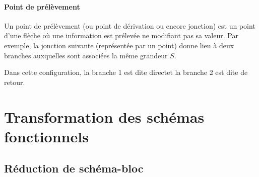 \paragraph{Point de prélèvement}
Un point de prélèvement (ou point de dérivation ou encore jonction) 
est un point d'une flèche où une information est prélevée ne modifiant pas 
sa valeur. Par exemple, la jonction suivante (représentée par un point) donne 
lieu à deux branches auxquelles sont associées la même grandeur $S$.
\begin{center}

\end{center}
Dans cette configuration, la branche 1 est dite \og direct\fg et la 
branche 2 est dite de \og retour\fg.
\newpage
\section{Transformation des schémas fonctionnels}
\subsection{Réduction de schéma-bloc}
